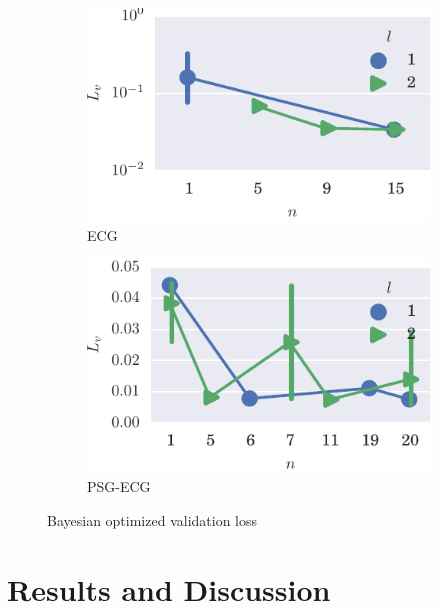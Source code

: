 \begin{figure}
    \ContinuedFloat %

    \begin{subfigure}[t]{\textwidth} 
        \centering
        \includegraphics[]{figs/bo_ecg.pdf}
        \caption{ECG}
    \end{subfigure}%

    \begin{subfigure}[t]{\textwidth} 
        \centering
        \includegraphics[]{figs/bo_sleep.pdf}
        \caption{PSG-ECG}
    \end{subfigure}%

\label{fig:bo}
\caption{Bayesian optimized validation loss} %
\end{figure}



\section{Results and Discussion}
\label{sec:results}

